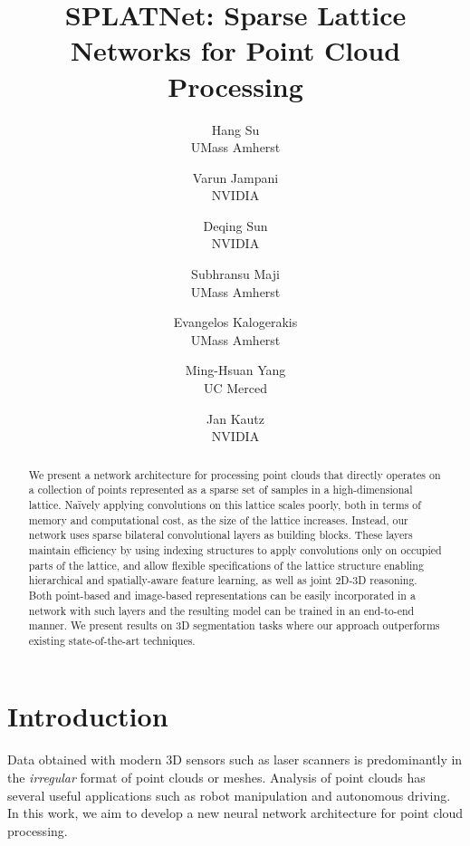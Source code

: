 \documentclass[10pt,twocolumn,letterpaper]{article}
\begin{document}
\title{SPLATNet: Sparse Lattice Networks for Point Cloud Processing}

\author{Hang Su\\
UMass Amherst
\and
Varun Jampani\\
NVIDIA
\and
Deqing Sun\\
NVIDIA
\and
Subhransu Maji\\
UMass Amherst
\and
Evangelos Kalogerakis\\
UMass Amherst
\and
Ming-Hsuan Yang\\
UC Merced
\and
Jan Kautz\\
NVIDIA
}

\maketitle

\begin{abstract}
We present a network architecture for processing point clouds that directly operates on a collection of points represented as a sparse set of samples in a high-dimensional lattice.
Na\"ively applying convolutions on this lattice scales poorly, both in terms of memory and computational cost, as the size of the lattice increases.
Instead, our network uses sparse bilateral convolutional layers as building blocks.
These layers maintain efficiency by using indexing structures to apply convolutions only on occupied parts of the lattice, and allow flexible specifications of the lattice structure enabling hierarchical and spatially-aware feature learning, as well as joint 2D-3D reasoning. 
Both point-based and image-based representations can be easily incorporated in a network with such layers and the resulting model can be trained in an end-to-end manner.
We present results on 3D segmentation tasks where our approach outperforms existing state-of-the-art techniques.
\end{abstract}\vspace{-3mm}

\section{Introduction}%
Data obtained with modern 3D sensors such as laser scanners is predominantly in the \emph{irregular} format
of point clouds or meshes.
Analysis of point clouds has several useful applications such as robot
manipulation and autonomous driving. In this work, we aim to develop a new neural network architecture
for point cloud processing.
\end{document}
